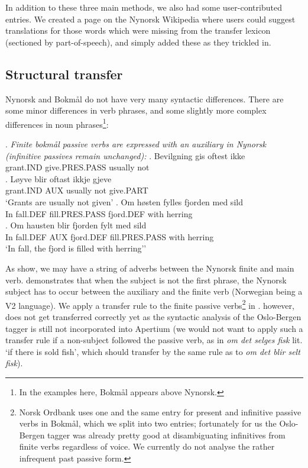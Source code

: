 \documentclass[11pt]{article}
\begin{document}
In addition to these three main methods, we also had some
user-contributed entries. We created a page on the Nynorsk Wikipedia
where users could suggest translations for those words which were
missing from the transfer lexicon (sectioned by part-of-speech), and
simply added these as they trickled in.


\subsection{Structural transfer}
\label{sec:structural-transfer}
Nynorsk and Bokmål do not have very many syntactic differences. There
are some minor differences in verb phrases, and some slightly more
complex differences in noun phrases\footnote{In the examples here,
  Bokmål appears above Nynorsk.}:

\setlength{\Exlabelsep}{1.1em} %
\alignSubExtrue %
\ex. \label{pass} \emph{Finite bokmål passive verbs are expressed with an auxiliary
  in Nynorsk (infinitive passives remain unchanged):}
\ag. Bevilgning gis oftest ikke\\
grant.IND give.PRES.PASS usually not\\
\bg. Løyve blir oftast ikkje gjeve\\
grant.IND AUX usually not give.PART \\
`Grants are usually not given'
\cg. Om høsten fylles fjorden med sild\\
In fall.DEF fill.PRES.PASS fjord.DEF with herring\\
\label{pass-syntax}
\dg. Om hausten blir fjorden fylt med sild\\
In fall.DEF AUX fjord.DEF fill.PRES.PASS with herring\\ 
`In fall, the fjord is filled with herring''

As \Last[a-b] show, we may have a string of adverbs between the
Nynorsk finite and main verb. \Last[c-d] demonstrates that when the
subject is not the first phrase, the Nynorsk subject has to occur
between the auxiliary and the finite verb (Norwegian being a V2
language). We apply a transfer rule to the finite passive
verbs\footnote{Norsk Ordbank uses
  one and the same entry for present and infinitive passive verbs in
  Bokmål, which we split into two entries; fortunately for us the
  Oslo-Bergen tagger was already pretty good at disambiguating
  infinitives from finite verbs regardless of voice. We currently
  do not analyse the
  rather infrequent past passive form.} in \Last[a-b]. \Last[c-d]
however, does not get transferred correctly yet as the syntactic
analysis of the Oslo-Bergen tagger is still not incorporated into
Apertium (we would not want to apply such a transfer rule if a
non-subject followed the passive verb, as in \emph{om det selges fisk}
lit. `if there is sold fish', which should transfer by the same rule
as \Last[a-b] to \emph{om det
  blir selt fisk}).
\end{document}

